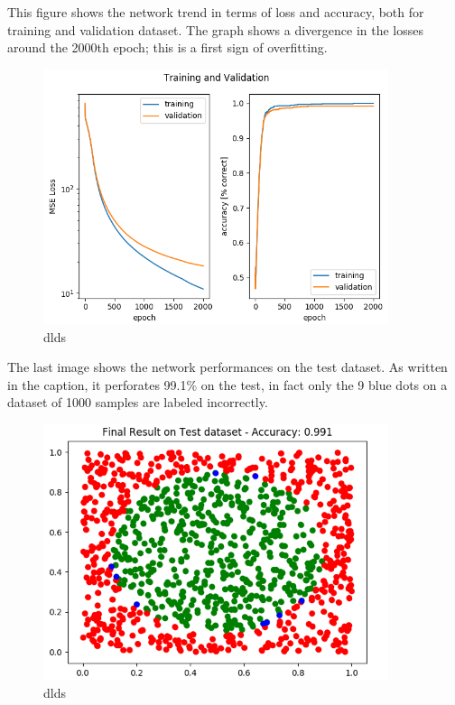 \begin{minipage}{0.45\textwidth} 
	This figure shows the network trend in terms of loss and accuracy, both for training and validation dataset. The graph shows a divergence in the losses around the 2000th epoch; this is a first sign of overfitting.
\end{minipage}
\begin{minipage}{0.5\textwidth} \raggedleft 
	\begin{figure}[H]
		\includegraphics[width=0.9\textwidth]{Images/LossAccFinal.png}
		\centering
		\caption{dlds}
		\centering
	\end{figure}
\end{minipage}


\begin{minipage}{0.45\textwidth} 
	The last image shows the network performances on the test dataset. As written in the caption, it perforates 99.1\% on the test, in fact only the 9 blue dots on a dataset of 1000 samples are labeled incorrectly.
\end{minipage}
\begin{minipage}{0.5\textwidth} \raggedleft 
	\begin{figure}[H]
		\includegraphics[width=0.9\textwidth]{Images/FinalTestAccuracy.png}
		\centering
		\caption{dlds}
		\centering
	\end{figure}
\end{minipage}

